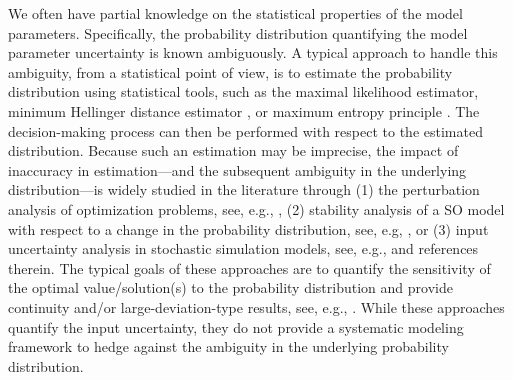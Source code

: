 \documentclass[final,onefignum,onetabnum]{class}
\begin{document}
We often have partial knowledge on the statistical properties of the model parameters.  Specifically, the probability distribution quantifying the model parameter uncertainty is known ambiguously. 
A typical approach  to handle this ambiguity, from a statistical point of view, is to  estimate the probability distribution using statistical tools, such as the maximal likelihood estimator, minimum Hellinger distance estimator \cite{vidyashankar2015}, or maximum entropy principle \cite{grunwald2004game}. The decision-making process can then be performed with respect to the estimated distribution. 
Because such an estimation may be imprecise, the impact of inaccuracy in estimation---and the subsequent ambiguity in the underlying distribution---is widely studied in the literature through (1) the  perturbation analysis of optimization problems, see, e.g., \citet{bonnans2013Perturbation}, (2) stability analysis of a SO model with respect to a change in the probability distribution, see, e.g, \citet{rachev1991,romisch2003}, or (3) input uncertainty analysis in stochastic simulation models, see, e.g., \citet{lam2016input} and references therein. The typical goals of  these approaches are to quantify the sensitivity of the optimal value/solution(s) to the probability distribution and provide continuity and/or large-deviation-type   results, see, e.g., \citet{dupavcova1990stability,schultz2000,heitsch2006stability,rachev2002quantitative,pflug2012distance}. While these approaches quantify the input uncertainty, they do not provide a systematic modeling framework to hedge against the ambiguity in the underlying probability distribution. %
\end{document}
